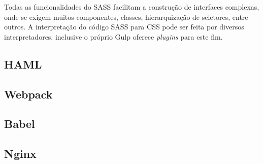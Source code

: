 Todas as funcionalidades do SASS facilitam a construção de interfaces complexas, onde se exigem muitos componentes, classes, hierarquização de seletores, entre outros. A interpretação do código SASS para CSS pode ser feita por diversos interpretadores, inclusive o próprio Gulp oferece \textit{plugins} para este fim.

\subsection{HAML}


\subsection{Webpack}


\subsection{Babel}


\subsection{Nginx}